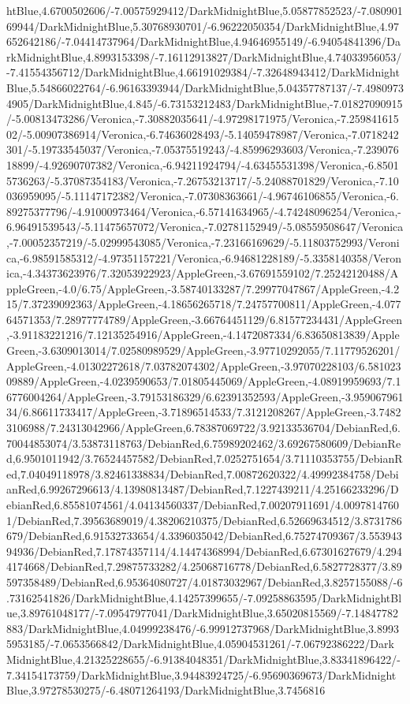 {\begin{tikzternal}
htBlue,4.6700502606/-7.00575929412/DarkMidnightBlue,5.05877852523/-7.08090169944/DarkMidnightBlue,5.30768930701/-6.96222050354/DarkMidnightBlue,4.97652642186/-7.04414737964/DarkMidnightBlue,4.94646955149/-6.94054841396/DarkMidnightBlue,4.8993153398/-7.16112913827/DarkMidnightBlue,4.74033956053/-7.41554356712/DarkMidnightBlue,4.66191029384/-7.32648943412/DarkMidnightBlue,5.54866022764/-6.96163393944/DarkMidnightBlue,5.04357787137/-7.49809734905/DarkMidnightBlue,4.845/-6.73153212483/DarkMidnightBlue,-7.01827090915/-5.00813473286/Veronica,-7.30882035641/-4.97298171975/Veronica,-7.25984161502/-5.00907386914/Veronica,-6.74636028493/-5.14059478987/Veronica,-7.0718242301/-5.19733545037/Veronica,-7.05375519243/-4.85996293603/Veronica,-7.23907618899/-4.92690707382/Veronica,-6.94211924794/-4.63455531398/Veronica,-6.85015736263/-5.37087354183/Veronica,-7.26753213717/-5.24088701829/Veronica,-7.10036959095/-5.11147172382/Veronica,-7.07308363661/-4.96746106855/Veronica,-6.89275377796/-4.91000973464/Veronica,-6.57141634965/-4.74248096254/Veronica,-6.96491539543/-5.11475657072/Veronica,-7.02781152949/-5.08559508647/Veronica,-7.00052357219/-5.02999543085/Veronica,-7.23166169629/-5.11803752993/Veronica,-6.98591585312/-4.97351157221/Veronica,-6.94681228189/-5.3358140358/Veronica,-4.34373623976/7.32053922923/AppleGreen,-3.67691559102/7.25242120488/AppleGreen,-4.0/6.75/AppleGreen,-3.58740133287/7.29977047867/AppleGreen,-4.215/7.37239092363/AppleGreen,-4.18656265718/7.24757700811/AppleGreen,-4.07764571353/7.28977774789/AppleGreen,-3.66764451129/6.81577234431/AppleGreen,-3.91183221216/7.12135254916/AppleGreen,-4.1472087334/6.83650813839/AppleGreen,-3.6309013014/7.02580989529/AppleGreen,-3.97710292055/7.11779526201/AppleGreen,-4.01302272618/7.03782074302/AppleGreen,-3.97070228103/6.58102309889/AppleGreen,-4.0239590653/7.01805445069/AppleGreen,-4.08919959693/7.16776004264/AppleGreen,-3.79153186329/6.62391352593/AppleGreen,-3.95906796134/6.86611733417/AppleGreen,-3.71896514533/7.3121208267/AppleGreen,-3.74823106988/7.24313042966/AppleGreen,6.78387069722/3.92133536704/DebianRed,6.70044853074/3.53873118763/DebianRed,6.75989202462/3.69267580609/DebianRed,6.9501011942/3.76524457582/DebianRed,7.0252751654/3.71110353755/DebianRed,7.04049118978/3.82461338834/DebianRed,7.00872620322/4.49992384758/DebianRed,6.99267296613/4.13980813487/DebianRed,7.1227439211/4.25166233296/DebianRed,6.85581074561/4.04134560337/DebianRed,7.00207911691/4.00978147601/DebianRed,7.39563689019/4.38206210375/DebianRed,6.52669634512/3.8731786679/DebianRed,6.91532733654/4.3396035042/DebianRed,6.75274709367/3.55394394936/DebianRed,7.17874357114/4.14474368994/DebianRed,6.67301627679/4.2944174668/DebianRed,7.29875733282/4.25068716778/DebianRed,6.5827728377/3.89597358489/DebianRed,6.95364080727/4.01873032967/DebianRed,3.8257155088/-6.73162541826/DarkMidnightBlue,4.14257399655/-7.09258863595/DarkMidnightBlue,3.89761048177/-7.09547977041/DarkMidnightBlue,3.65020815569/-7.14847782883/DarkMidnightBlue,4.04999238476/-6.99912737968/DarkMidnightBlue,3.89935953185/-7.0653566842/DarkMidnightBlue,4.05904531261/-7.06792386222/DarkMidnightBlue,4.21325228655/-6.91384048351/DarkMidnightBlue,3.83341896422/-7.34154173759/DarkMidnightBlue,3.94483924725/-6.95690369673/DarkMidnightBlue,3.97278530275/-6.48071264193/DarkMidnightBlue,3.7456816
\end{tikzternal}}
